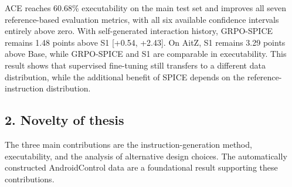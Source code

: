 ACE reaches 60.68\% executability on the main test set and improves all seven reference-based evaluation metrics, with all six available confidence intervals entirely above zero. With self-generated interaction history, GRPO-SPICE remains 1.48 points above S1 [+0.54, +2.43]. On AitZ, S1 remains 3.29 points above Base, while GRPO-SPICE and S1 are comparable in executability. This result shows that supervised fine-tuning still transfers to a different data distribution, while the additional benefit of SPICE depends on the reference-instruction distribution.

\subsection*{2. Novelty of thesis}

The three main contributions are the instruction-generation method, executability, and the analysis of alternative design choices. The automatically constructed AndroidControl data are a foundational result supporting these contributions.

